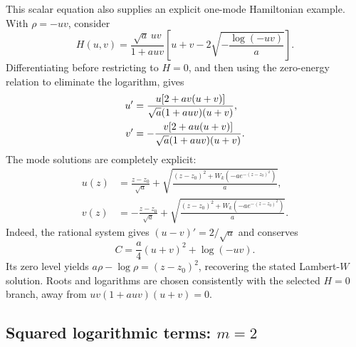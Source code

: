 \documentclass[11pt,a4paper]{article}
\numberwithin{equation}{section}
\begin{document}
This scalar equation also supplies an explicit one-mode Hamiltonian example. With $\rho=-uv$, consider
\begin{equation}
    H(u,v)=\frac{\sqrt a\,uv}{1+a uv}
       \left[u+v-2\sqrt{-\frac{\log(-uv)}a}\right].
    \label{eq:lambert-log-mode-hamiltonian}
\end{equation}
Differentiating before restricting to $H=0$, and then using the zero-energy relation to eliminate the logarithm, gives
\begin{align}
    u'&=\frac{u[2+a v(u+v)]}{\sqrt a(1+a uv)(u+v)},\notag\\
    v'&=-\frac{v[2+a u(u+v)]}{\sqrt a(1+a uv)(u+v)}.
    \label{eq:lambert-log-mode-equations}
\end{align}
The mode solutions are completely explicit:
\begin{equation}
\begin{aligned}
    u(z)&=\frac{z-z_0}{\sqrt a}
        +\sqrt{\frac{(z-z_0)^2+W_k\!\left(-a e^{-(z-z_0)^2}\right)}{a}},\\
    v(z)&=-\frac{z-z_0}{\sqrt a}
        +\sqrt{\frac{(z-z_0)^2+W_k\!\left(-a e^{-(z-z_0)^2}\right)}{a}}.
\end{aligned}
    \label{eq:lambert-log-explicit-modes}
\end{equation}
Indeed, the rational system gives $(u-v)'=2/\sqrt a$ and conserves
\begin{equation}
    C=\frac a4(u+v)^2+\log(-uv).
    \label{eq:lambert-log-mode-integral}
\end{equation}
Its zero level yields $a\rho-\log\rho=(z-z_0)^2$, recovering the stated Lambert-$W$ solution. Roots and logarithms are chosen consistently with the selected $H=0$ branch, away from $uv(1+a uv)(u+v)=0$.

\subsection{Squared logarithmic terms: \texorpdfstring{$m=2$}{m=2}}
\label{sec:log-quadratic-examples}
\end{document}
